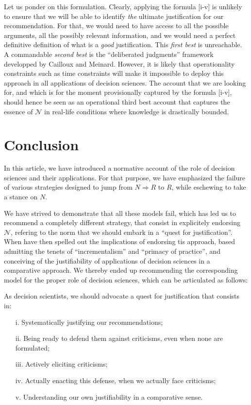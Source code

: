 \documentclass[preprint, french, english, 11pt, authoryear]{elsarticle}%
\newcommand{\adv}{\mathscr{N}}
\begin{document}
Let us ponder on this formulation. Clearly, applying the formula [i-v] is unlikely to ensure that we will be able to identify \emph{the} ultimate justification for our recommendation. For that, we would need to have access to all the possible arguments, all the possibly relevant information, and we would need a perfect definitive definition of what is a \emph{good} justification. This \emph{first best} is unreachable. A commandable \emph{second best} is the ``deliberated judgments'' framework developped by Cailloux and Meinard. However, it is likely that operationality constraints such as time constraints will make it impossible to deploy this approach in all applications of decision sciences. The account that we are looking for, and which is for the moment provisionally captured by the formula [i-v], should hence be seen as an operational third best account that captures the essence of $\adv$ in real-life conditions where knowledge is drastically bounded.

\section{Conclusion}
In this article, we have introduced a normative account of the role of decision sciences and their applications. For that purpose, we have emphasized the failure of various strategies designed  to jump from $N ⇒ R$ to $R$, while eschewing to take a stance on $N$.

We have strived to demonstrate that all these models fail, which has led us to recommend a completely different strategy, that consist in explicitely endorsing $\adv$, refering to the norm that we should embark in a ``quest for justification''. When have then spelled out the implications of endorsing tis approach, based admitting the tenets of ``incrementalism'' and ``primacy of practice'', and conceiving of the justifiability of applications of decision sciences in a comparative approach. We thereby ended up recommending the corresponding model for the proper role of decision sciences, which can be articulated as follows:

As decision scientists, we should advocate a quest for justification that consists in:
\begin{itemize}
\item[i.]	Systematically justifying our recommendations;
\item[ii.]	Being ready to defend them against criticisms, even when none are formulated;
\item[iii.]	Actively eliciting criticisms;
\item[iv.]	Actually enacting this defense, when we actually face criticisms;
\item[v.]	Understanding our own justifiability in a comparative sense.
\end{itemize}
\end{document}
